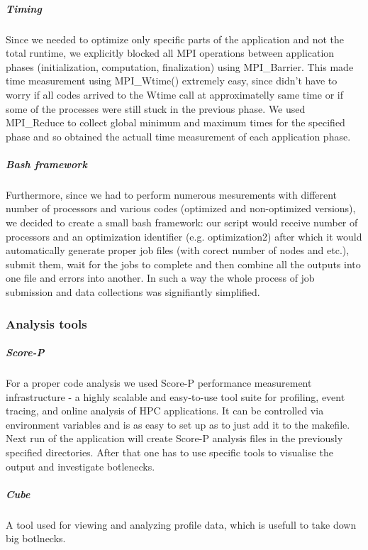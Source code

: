 \documentclass{article}
\begin{document}
\subparagraph{Timing}
Since we needed to optimize only specific parts of the application and not the total runtime, we explicitly blocked all MPI operations between application phases (initialization, computation, finalization) using MPI\_Barrier. This made time measurement using MPI\_Wtime() extremely easy, since didn't have to worry if all codes arrived to the Wtime call at approximatelly same time or if some of the processes were still stuck in the previous phase. We used MPI\_Reduce to collect global minimum and maximum times for the specified phase and so obtained the actuall time measurement of each application phase.

\subparagraph{Bash framework}
Furthermore, since we had to perform numerous mesurements with different number of processors and various codes (optimized and non-optimized versions), we decided to create a small bash framework: our script would receive number of processors and an optimization identifier (e.g. optimization2) after which it would automatically generate proper job files (with corect number of nodes and etc.), submit them, wait for the jobs to complete and then combine all the outputs into one file and errors into another. In such a way the whole process of job submission and data collections was signifiantly simplified.

\subsubsection{Analysis tools}
\subparagraph{Score-P}
For a proper code analysis we used Score-P performance measurement infrastructure - a highly scalable and easy-to-use tool suite for profiling, event tracing, and online analysis of HPC applications. It can be controlled via environment variables and is as easy to set up as to just add it to the makefile. Next run of the application will create Score-P analysis files in the previously specified directories. After that one has to use specific tools to visualise the output and investigate botlenecks.

\subparagraph{Cube}
A tool used for viewing and analyzing profile data, which is usefull to take down big botlnecks. 
\end{document}
